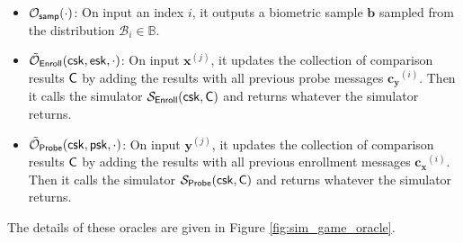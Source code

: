 \begin{itemize}

	\item $\mathcal{O}_{\sf samp}(\cdot)$: On input an index $i$, it outputs a biometric sample $\mathbf{b}$ sampled from the distribution $\mathcal{B}_i \in \mathbb{B}$.
	
	\item $\tilde{\mathcal{O}}_{\sf Enroll} ({\sf csk} ,{\sf esk}, \cdot)$: On input $\mathbf{x}^{(j)}$, it updates the collection of comparison results ${\sf C}$ by adding the results with all previous probe messages $\mathbf{c_y}^{(i)}$. Then it calls the simulator $\mathcal{S}_{\sf Enroll}({\sf csk}, {\sf C})$ and returns whatever the simulator returns.

	\item $\tilde{\mathcal{O}}_{\sf Probe} ({\sf csk}, {\sf psk}, \cdot)$: On input $\mathbf{y}^{(j)}$, it updates the collection of comparison results ${\sf C}$ by adding the results with all previous enrollment messages $\mathbf{c_x}^{(i)}$. Then it calls the simulator $\mathcal{S}_{\sf Probe}({\sf csk}, {\sf C})$ and returns whatever the simulator returns.

\end{itemize}

The details of these oracles are given in Figure \ref{fig:sim_game_oracle}.

